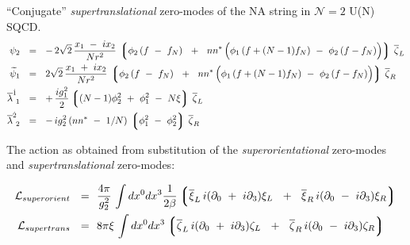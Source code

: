 \documentclass{letter}
\newcommand{\p}{\partial}
\newcommand{\wt}{\widetilde}
\newcommand{\ov}{\overline}
\newcommand{\mc}[1]{\mathcal{#1}}
\newcommand{\md}{\mathcal{D}}
\newcommand{\lgr}{\left\lgroup}
\newcommand{\rgr}{\right\rgroup}
\begin{document}
 ``Conjugate'' {\it supertranslational} zero-modes of the NA string in ${\mathcal N}=2$ U(N) SQCD.
\begin{align*}
%
\psi_{2}	& ~~=~~  -\,  2\sqrt{2}\, \frac{x_1 ~-~ i x_2}{N r^2} \,
		\lgr \phi_2\, (f ~-~ f_N) ~~+~~
			n n^*\, \Bigl( \phi_1\,( f + (N-1) f_N) ~-~ \phi_2\, (f - f_N) \Bigr) 
		\rgr\, \ov{\zeta}_L 
		\\
%
\wt{\psi}_{1} & ~~=~~    2\sqrt{2} \, \frac{x_1 ~+~ i x_2}{N r^2} \,
		\lgr \phi_2\, (f ~-~ f_N) ~~+~~
			n n^*\, \Bigl( \phi_1\,( f + (N-1) f_N) ~-~ \phi_2\, (f - f_N) \Bigr) 
		\rgr\, \ov{\zeta}_R
		\\
%
\ov{\lambda}^{\dot{1}}_{\ 1} 	& ~~=~~ +\, \frac{i g_1^2}{2} \lgr (N-1)\phi_2^2  ~+~ \phi_1^2 ~-~ N\xi \rgr \, \ov{\zeta}_L 
		\\
%
\ov{\lambda}^{\dot{2}}_{\ 2}	& ~~=~~ -\, {i g_2^2}\, ( nn^* ~-~ 1/N )\, \lgr \phi_1^2 ~-~ \phi_2^2 \rgr\, \ov{\zeta}_R
\end{align*}



	The action as obtained from substitution of the {\it superorientational} zero-modes and
	{\it supertranslational} zero-modes:

\begin{align*}
%
\mc{L}_{superorient} ~~=~~ &
	\frac{4\pi}{g_2^2}\,
	\int dx^0 dx^3 \frac{1}{2\beta} 
	\left\lgroup 
	\ov{\xi}_L \, i (\p_0 ~+~ i \p_3 ) \xi_L ~~+~~ \ov{\xi}_R \, i (\p_0 ~-~ i \p_3 ) \xi_R 
	\right\rgroup 
	\\
%
\mc{L}_{supertrans} ~~=~~ &
	8 \pi \xi\,
	\int dx^0 dx^3
	\lgr
		\ov{\zeta}_L \, i (\p_0 ~+~ i \p_3 ) \zeta_L ~~+~~ 
		\ov{\zeta}_R \, i (\p_0 ~-~ i \p_3 ) \zeta_R 
	\rgr
\end{align*}

%
%
\vspace{5.0cm}
\end{document}
